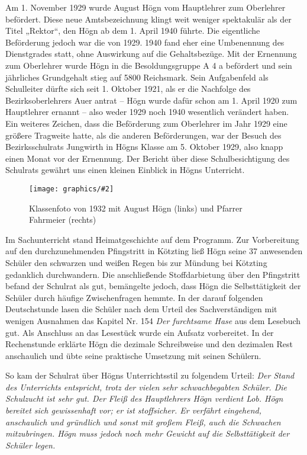 \documentclass{book}
\newcommand{\img}[2][width=\linewidth]{\noindent\texttt{[image: graphics/\#2]}}
\begin{document}
Am 1. November 1929 wurde August Högn vom Hauptlehrer zum Oberlehrer
befördert. Diese neue Amtsbezeichnung klingt weit weniger spektakulär
als der Titel „Rektor“, den Högn ab dem 1. April 1940 führte. Die
eigentliche Beförderung jedoch war die von 1929. 1940 fand eher eine
Umbenennung des Dienstgrades statt, ohne Auswirkung auf die
Gehaltsbezüge. Mit der Ernennung zum Oberlehrer wurde Högn in die
Besoldungsgruppe A 4 a befördert und sein jährliches Grundgehalt stieg
auf 5800 Reichsmark. Sein Aufgabenfeld als Schulleiter dürfte sich
seit 1. Oktober 1921, als er die Nachfolge des Bezirksoberlehrers Auer
antrat – Högn wurde dafür schon am 1. April 1920 zum Hauptlehrer
ernannt – also weder 1929 noch 1940 wesentlich verändert haben. Ein
weiteres Zeichen, dass die Beförderung zum Oberlehrer im Jahr 1929 eine
größere Tragweite hatte, als die anderen Beförderungen, war der
Besuch des Bezirksschulrats Jungwirth in Högns Klasse am 5. Oktober
1929, also knapp einen Monat vor der Ernennung. Der Bericht über diese
Schulbesichtigung des Schulrats gewährt uns einen kleinen Einblick in
Högns Unterricht.

\begin{figure}
\img{Klassenfoto-1932}
\caption{Klassenfoto von 1932 mit August Högn (links) und Pfarrer
Fahrmeier (rechts)}
\end{figure}

Im Sachunterricht stand Heimatgeschichte auf dem Programm. Zur
Vorbereitung auf den durchzunehmenden Pfingstritt in Kötzting ließ
Högn seine 37 anwesenden Schüler den schwarzen und weißen Regen bis zur
Mündung bei Kötzting gedanklich durchwandern. Die anschließende
Stoffdarbietung über den Pfingstritt befand der Schulrat als gut,
bemängelte jedoch, dass Högn die Selbsttätigkeit der Schüler durch
häufige Zwischenfragen hemmte. In der darauf folgenden Deutschstunde
lasen die Schüler nach dem Urteil des Sachverständigen mit wenigen
Ausnahmen das Kapitel Nr. 154 \textit{Der furchtsame Hase} aus dem
Lesebuch gut. Als Anschluss an das Lesestück wurde ein Aufsatz
vorbereitet. In der Rechenstunde erklärte Högn die dezimale
Schreibweise und den dezimalen Rest anschaulich und übte seine
praktische Umsetzung mit seinen Schülern.

So kam der Schulrat über Högns Unterrichtsstil zu folgendem Urteil:
\textit{Der Stand des Unterrichts entspricht, trotz der vielen sehr
schwachbegabten Schüler. Die Schulzucht ist sehr gut. Der Fleiß des
Hauptlehrers Högn verdient Lob. Högn bereitet sich gewissenhaft vor;
er ist stoffsicher. Er verfährt eingehend, anschaulich und gründlich
und sonst mit großem Fleiß, auch die Schwachen mitzubringen. Högn muss
jedoch noch mehr Gewicht auf die Selbsttätigkeit der Schüler legen.}
\end{document}

